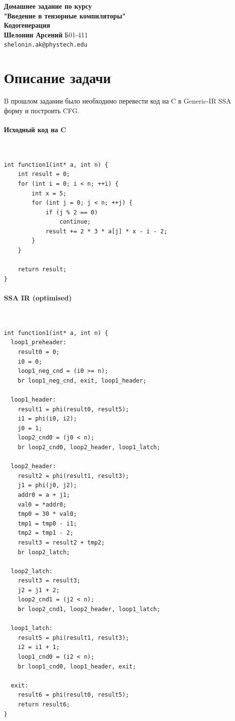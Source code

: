 


\graphicspath{{img/}}



\begin{center}
    {\Large \textbf{Домашнее задание по курсу \\ "Введение в тензорные компиляторы"}} \\[0.3cm]
    {\large \textbf{Кодогенерация}} \\[1cm]
    
    \textbf{Шелонин Арсений} Б01-411 \\
    \texttt{shelonin.ak@phystech.edu}
\end{center}

\tableofcontents
\newpage

\section{Описание задачи}
B прошлом задании было необходимо перевести код на C в Generic-IR SSA форму и построить CFG.

\paragraph{Исходный код на C} ~\\
\begin{lstlisting}
int function1(int* a, int n) {
    int result = 0;
    for (int i = 0; i < n; ++i) {
        int x = 5;
        for (int j = 0; j < n; ++j) {
            if (j % 2 == 0)
                continue;
            result += 2 * 3 * a[j] * x - i - 2;
        } 
    }

    return result;
}
\end{lstlisting}


\paragraph{SSA IR (optimised)} ~\\
\begin{lstlisting}
int function1(int* a, int n) {
  loop1_preheader:
    result0 = 0;
    i0 = 0;
    loop1_neg_cnd = (i0 >= n);
    br loop1_neg_cnd, exit, loop1_header;

  loop1_header:
    result1 = phi(result0, result5);
    i1 = phi(i0, i2);
    j0 = 1;
    loop2_cnd0 = (j0 < n);
    br loop2_cnd0, loop2_header, loop1_latch;

  loop2_header:
    result2 = phi(result1, result3);
    j1 = phi(j0, j2);
    addr0 = a + j1;
    val0 = *addr0;
    tmp0 = 30 * val0;
    tmp1 = tmp0 - i1;
    tmp2 = tmp1 - 2;
    result3 = result2 + tmp2;
    br loop2_latch;

  loop2_latch:
    result3 = result3;
    j2 = j1 + 2;
    loop2_cnd1 = (j2 < n);
    br loop2_cnd1, loop2_header, loop1_latch;

  loop1_latch:
    result5 = phi(result1, result3);
    i2 = i1 + 1;
    loop1_cnd0 = (i2 < n);
    br loop1_cnd0, loop1_header, exit;

  exit:
    result6 = phi(result0, result5);
    return result6;
}
\end{lstlisting}


